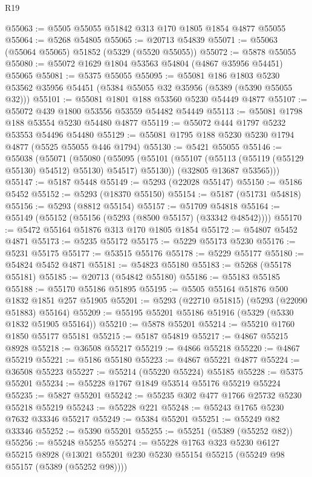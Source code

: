 \begin{lexlean}{R19}
\begin{coremodule}
@55063 := @5505 @55055 @51842 @313 @170 @1805 @1854 @4877 @55055
@55064 := @5268 @54805
@55065 := @20713 @54839
@55071 := @55063 (@55064 @55065) @51852 (@5329 (@5520 @55055))
@55072 := @5878 @55055
@55080 := @55072 @1629 @1804 @53563 @54804 (@4867 @35956 @54451) @55065
@55081 := @5375 @55055
@55095 := @55081
    @186
    @1803
    @5230
    @53562
    @35956
    @54451
    (@5384 @55055 @32 @35956 (@5389 (@5390 @55055 @32)))
@55101 := @55081 @1801 @188 @53560 @5230 @54449 @4877
@55107 := @55072 @439 @1800 @53556 @53559 @54482 @54449
@55113 := @55081 @1798 @188 @53554 @5230 @54480 @4877
@55119 := @55072 @444 @1797 @5232 @53553 @54496 @54480
@55129 := @55081 @1795 @188 @5230 @5230 @1794 @4877 (@5525 @55055 @446 @1794)
@55130 := @5421 @55055
@55146 := @55038
    (@55071
      (@55080
        (@55095 (@55101 (@55107 (@55113 (@55119 (@55129 @55130) @54512) @55130) @54517) @55130))
        (@32805 @13687 @53565)))
@55147 := @5187 @5448
@55149 := @5293 (@22028 @55147)
@55150 := @5186 @5452
@55152 := @5293 (@18370 @55150)
@55154 := @5187 (@51731 @54818)
@55156 := @5293 (@8812 @55154)
@55157 := @51709 @54818
@55164 := @55149 (@55152 (@55156 (@5293 (@8500 @55157) (@33342 @48542))))
@55170 := @5472 @55164 @51876 @313 @170 @1805 @1854
@55172 := @54807 @5452 @4871
@55173 := @5235 @55172
@55175 := @5229 @55173 @5230
@55176 := @5231 @55175
@55177 := @53515 @55176
@55178 := @5229 @55177
@55180 := @54824 @5452 @4871
@55181 := @54823 @55180
@55183 := @5268 (@55178 @55181)
@55185 := @20713 (@54842 @55180)
@55186 := @55183 @55185
@55188 := @55170 @55186 @51895
@55195 := @5505 @55164 @51876 @500 @1832 @1851 @257 @51905
@55201 := @5293 (@22710 @51815) (@5293 (@22090 @51883) @55164)
@55209 := @55195 @55201 @55186 @51916 (@5329 (@5330 @1832 @51905 @55164))
@55210 := @5878 @55201
@55214 := @55210 @1760 @1850 @55177 @55181
@55215 := @5187 @54819
@55217 := @4867 @55215 @8928
@55218 := @36508 @55217
@55219 := @4866 @55218
@55220 := @4867 @55219
@55221 := @5186 @55180
@55223 := @4867 @55221 @4877
@55224 := @36508 @55223
@55227 := @55214 (@55220 @55224) @55185
@55228 := @5375 @55201
@55234 := @55228 @1767 @1849 @53514 @55176 @55219 @55224
@55235 := @5827 @55201
@55242 := @55235 @302 @477 @1766 @25732 @5230 @55218 @55219
@55243 := @55228 @221
@55248 := @55243 @1765 @5230 @7632 @33346 @55217
@55249 := @5384 @55201
@55251 := @55249 @82 @33346
@55252 := @5390 @55201
@55255 := @55251 (@5389 (@55252 @82))
@55256 := @55248 @55255
@55274 := @55228
    @1763
    @323
    @5230
    @6127
    @55215
    @8928
    (@13021 @55201 @230 @5230 @55154 @55215 (@55249 @98 @55157 (@5389 (@55252 @98))))

\end{coremodule}
\end{lexlean}
